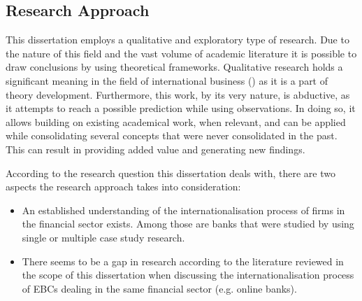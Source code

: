 \documentclass[11pt,a4paper]{article}
\begin{document}
{{\subsection{Research Approach} %
 \par
This dissertation employs a qualitative and exploratory type of research. Due to the nature of this field and the vast volume of academic literature it is possible to draw conclusions by using theoretical frameworks. Qualitative research holds a significant meaning in the field of international business (\cite{dozQualitativeResearchInternational2011}) as it is a part of theory development. Furthermore, this work, by its very nature, is abductive, as it attempts to reach a possible prediction while using observations. In doing so, it allows building on existing academical work, when relevant, and can be applied while consolidating several concepts that were never consolidated in the past. This can result in providing added value and generating new findings. \par %
According to the research question this dissertation deals with, there are two aspects the research approach takes into consideration:
\begin{itemize}
 \item {An established understanding of the internationalisation process of firms in the financial sector exists. Among those are banks that were studied by using single or multiple case study research.}
 \item{There seems to be a gap in research according to the literature reviewed in the scope of this dissertation when discussing the internationalisation process of EBCs dealing in the same financial sector (e.g. online banks). }
\end{itemize}


}}
\end{document}
